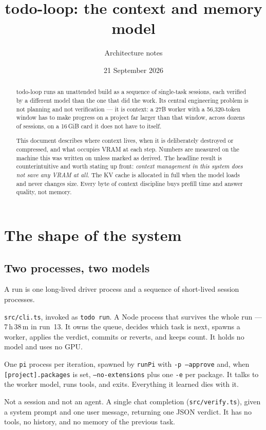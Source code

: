 \documentclass[11pt,a4paper]{article}
\title{\textbf{todo-loop: the context and memory model}}
\author{Architecture notes}
\date{21 September 2026}
\newcommand{\file}[1]{\texttt{#1}}
\newcommand{\key}[1]{\texttt{#1}}
\begin{document}
\maketitle

\begin{abstract}
\noindent
todo-loop runs an unattended build as a sequence of single-task sessions, each
verified by a different model than the one that did the work. Its central
engineering problem is not planning and not verification --- it is context: a
27B worker with a 56{,}320-token window has to make progress on a project far
larger than that window, across dozens of sessions, on a 16\,GiB card it does
not have to itself.

This document describes where context lives, when it is deliberately destroyed
or compressed, and what occupies VRAM at each step. Numbers are measured on the
machine this was written on unless marked as derived. The headline result is
counterintuitive and worth stating up front: \emph{context management in this
system does not save any VRAM at all.} The KV cache is allocated in full when
the model loads and never changes size. Every byte of context discipline buys
prefill time and answer quality, not memory.
\end{abstract}

\tableofcontents
\clearpage

\section{The shape of the system}

\subsection{Two processes, two models}

A run is one long-lived driver process and a sequence of short-lived session
processes.

\begin{description}[leftmargin=1.5em,style=nextline]
  \item[The driver] \file{src/cli.ts}, invoked as \texttt{todo run}. A Node
  process that survives the whole run --- 7\,h\,38\,m in run~13. It owns the
  queue, decides which task is next, spawns a worker, applies the verdict,
  commits or reverts, and keeps count. It holds no model and uses no GPU.
  \item[The session] One \texttt{pi} process per iteration, spawned by
  \file{runPi} with \texttt{-p --approve} and, when \key{[project].packages} is
  set, \texttt{--no-extensions} plus one \texttt{-e} per package. It talks to
  the worker model, runs tools, and exits. Everything it learned dies with it.
  \item[The verifier] Not a session and not an agent. A single chat completion
  (\file{src/verify.ts}), given a system prompt and one user message, returning
  one JSON verdict. It has no tools, no history, and no memory of the previous
  task.
\end{description}
\end{document}
